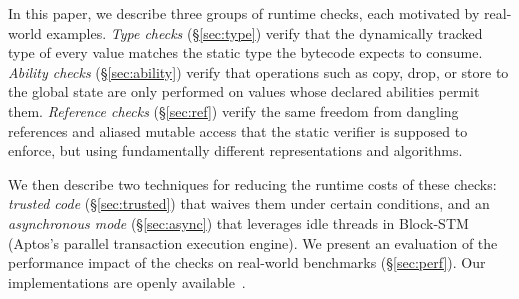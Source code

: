 In this paper, we describe three groups of runtime checks, each motivated by real-world examples.
\emph{Type checks} (\S\ref{sec:type}) verify that the dynamically tracked type of every value matches the static type the bytecode expects to consume.
\emph{Ability checks} (\S\ref{sec:ability}) verify that operations such as copy, drop, or store to the global state are only performed on values whose declared abilities permit them.
\emph{Reference checks} (\S\ref{sec:ref}) verify the same freedom from dangling references and aliased mutable access that the static verifier is supposed to enforce, but using fundamentally different representations and algorithms.

We then describe two techniques for reducing the runtime costs of these checks: \emph{trusted code} (\S\ref{sec:trusted}) that waives them under certain conditions, and an \emph{asynchronous mode} (\S\ref{sec:async}) that leverages idle threads in Block-STM~\cite{BlockSTM} (Aptos's parallel transaction execution engine).
We present an evaluation of the performance impact of the checks on real-world benchmarks (\S\ref{sec:perf}).
Our implementations are openly available~\cite{AptosCore}.
